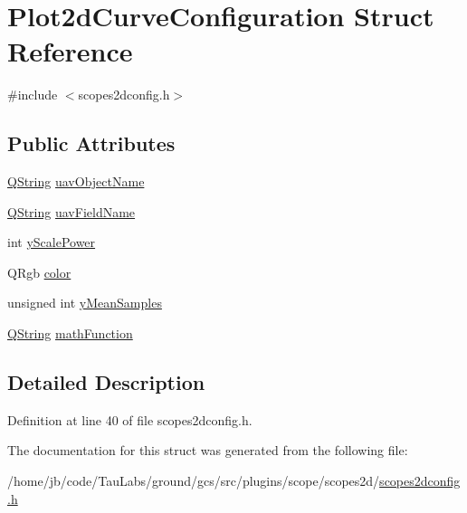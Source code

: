 \hypertarget{struct_plot2d_curve_configuration}{\section{\-Plot2d\-Curve\-Configuration \-Struct \-Reference}
\label{struct_plot2d_curve_configuration}
}


{\ttfamily \#include $<$scopes2dconfig.\-h$>$}

\subsection*{\-Public \-Attributes}
\begin{DoxyCompactItemize}
\item 
\hyperlink{group___u_a_v_objects_plugin_gab9d252f49c333c94a72f97ce3105a32d}{\-Q\-String} \hyperlink{group___scope_plugin_gaf7c7f2da1da17096fbffa1fdaa35d30e}{uav\-Object\-Name}
\item 
\hyperlink{group___u_a_v_objects_plugin_gab9d252f49c333c94a72f97ce3105a32d}{\-Q\-String} \hyperlink{group___scope_plugin_ga5f9e57253d839d8b0094e4360f61155f}{uav\-Field\-Name}
\item 
int \hyperlink{group___scope_plugin_ga42557670a9e1e7f792d3ecb795387425}{y\-Scale\-Power}
\item 
\-Q\-Rgb \hyperlink{group___scope_plugin_ga287675d34d68fc61f7de6bc82fed788d}{color}
\item 
unsigned int \hyperlink{group___scope_plugin_gabe6fab440d33b0a9cb4ad4db2950c26d}{y\-Mean\-Samples}
\item 
\hyperlink{group___u_a_v_objects_plugin_gab9d252f49c333c94a72f97ce3105a32d}{\-Q\-String} \hyperlink{group___scope_plugin_gac0be9d46aeaed52d3ee1e796946969ed}{math\-Function}
\end{DoxyCompactItemize}


\subsection{\-Detailed \-Description}


\-Definition at line 40 of file scopes2dconfig.\-h.



\-The documentation for this struct was generated from the following file\-:\begin{DoxyCompactItemize}
\item 
/home/jb/code/\-Tau\-Labs/ground/gcs/src/plugins/scope/scopes2d/\hyperlink{scopes2dconfig_8h}{scopes2dconfig.\-h}\end{DoxyCompactItemize}
